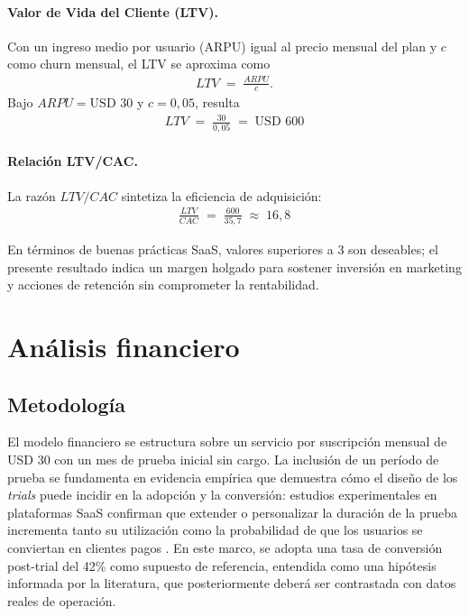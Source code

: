 \paragraph{Valor de Vida del Cliente (LTV).}
Con un ingreso medio por usuario (ARPU) igual al precio mensual del plan y $c$ como churn mensual, el LTV se aproxima como
\begin{align}
LTV \;=\; \frac{ARPU}{c}.
\end{align}
Bajo $ARPU = \text{USD }30$ y $c = 0{,}05$, resulta
\begin{align}
LTV \;=\; \frac{30}{0{,}05} \;=\; \text{USD }600
\end{align}

\paragraph{Relación LTV/CAC.}
La razón $LTV/CAC$ sintetiza la eficiencia de adquisición:
\begin{align}
\frac{LTV}{CAC} \;=\; \frac{600}{35{,}7} \;\approx\; 16{,}8
\end{align}

En términos de buenas prácticas SaaS, valores superiores a 3 son deseables; el presente resultado indica un margen holgado para sostener inversión en marketing y acciones de retención sin comprometer la rentabilidad.



\section{Análisis financiero}

\subsection{Metodología}

El modelo financiero se estructura sobre un servicio por suscripción mensual de USD 30 con un mes de prueba inicial sin cargo. La inclusión de un período de prueba se fundamenta en evidencia empírica que demuestra cómo el diseño de los \emph{trials} puede incidir en la adopción y la conversión: estudios experimentales en plataformas SaaS confirman que extender o personalizar la duración de la prueba incrementa tanto su utilización como la probabilidad de que los usuarios se conviertan en clientes pagos \parencite{zhang2025}. En este marco, se adopta una tasa de conversión post-trial del 42\% como supuesto de referencia, entendida como una hipótesis informada por la literatura, que posteriormente deberá ser contrastada con datos reales de operación.

